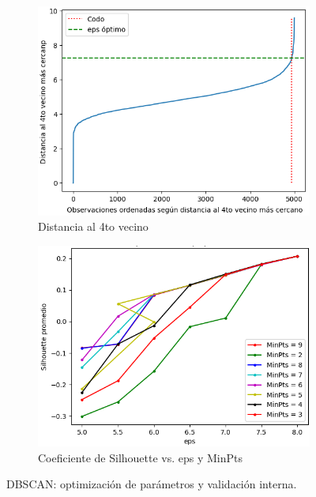 \documentclass{article}
\begin{document}
\begin{figure} [!htb]
	\centering
	\begin{subfigure}[b]{0.435\textwidth}
		\includegraphics[width= \textwidth]{fg/dbscan_codo.png}
        \caption{Distancia al 4to vecino}
		\label{fg_dbscan_codo}
	\end{subfigure}
	\begin{subfigure}[b]{0.45\textwidth}
		\includegraphics[width= \textwidth]{fg/dbscan_silhouette.png}
        \caption{Coeficiente de Silhouette vs. eps y MinPts}
        \label{fg_dbscan_silhouette}
	\end{subfigure}
	\caption{DBSCAN: optimización de parámetros y validación interna.}	
    \label{fg:dbscan}
\end{figure}
\end{document}
